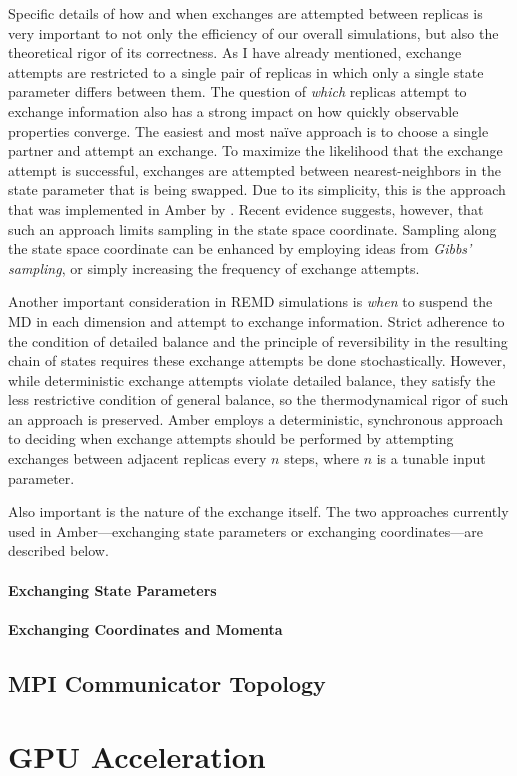Specific details of how and when exchanges are attempted between replicas is
very important to not only the efficiency of our overall simulations, but also
the theoretical rigor of its correctness. As I have already mentioned, exchange
attempts are restricted to a single pair of replicas in which only a single
state parameter differs between them. The question of \emph{which} replicas
attempt to exchange information also has a strong impact on how quickly
observable properties converge. The easiest and most na\"ive approach is to
choose a single partner and attempt an exchange. To maximize the likelihood that
the exchange attempt is successful, exchanges are attempted between
nearest-neighbors in the state parameter that is being swapped. Due to its
simplicity, this is the approach that was implemented in Amber by
\citeauthor{Cheng2005}. \cite{Cheng2005} Recent evidence suggests, however, that
such an approach limits sampling in the state space coordinate.
\cite{Chodera_JChemPhys_2011_v135_p194110} Sampling along the state space
coordinate can be enhanced by employing ideas from \emph{Gibbs' sampling},
\cite{Chodera_JChemPhys_2011_v135_p194110} or simply increasing the frequency
of exchange attempts. \cite{Sindhikara2008, Sindhikara2010}

Another important consideration in REMD simulations is \emph{when} to suspend
the MD in each dimension and attempt to exchange information. Strict adherence
to the condition of detailed balance and the principle of reversibility in the
resulting chain of states requires these exchange attempts be done
stochastically. \cite{Chodera_JChemPhys_2011_v135_p194110} However, while
deterministic exchange attempts violate detailed balance, they satisfy the less
restrictive condition of general balance, so the thermodynamical rigor of such
an approach is preserved. \cite{Chodera_JChemPhys_2011_v135_p194110} Amber
employs a deterministic, synchronous approach to deciding when exchange attempts
should be performed by attempting exchanges between adjacent replicas every $n$
steps, where $n$ is a tunable input parameter.

Also important is the nature of the exchange itself. The two approaches
currently used in Amber---exchanging state parameters or exchanging
coordinates---are described below.

\paragraph{Exchanging State Parameters}

\paragraph{Exchanging Coordinates and Momenta}

\subsection{MPI Communicator Topology}

\section{GPU Acceleration}

